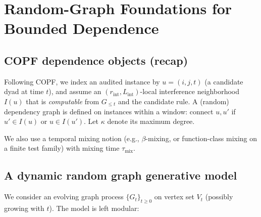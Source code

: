\documentclass[12pt,a4paper]{article}
\begin{document}


\section{Random-Graph Foundations for Bounded Dependence}
\label{sec:random_graph_foundations}

\subsection{COPF dependence objects (recap)}
Following COPF, we index an audited instance by
$u=(i,j,t)$ (a candidate dyad at time $t$), and assume
an $(r_{\mathrm{int}},L_{\mathrm{int}})$-local interference neighborhood $I(u)$
that is \emph{computable} from $G_{\le t}$ and the candidate rule.
A (random) dependency graph is defined on instances within a window:
connect $u,u'$ if $u'\in I(u)$ or $u\in I(u')$.
Let $\kappa$ denote its maximum degree.

We also use a temporal mixing notion (e.g., $\beta$-mixing, or function-class mixing on a
finite test family) with mixing time $\tau_{\mathrm{mix}}$.

\subsection{A dynamic random graph generative model}
\label{subsec:dyn_random_graph}

We consider an evolving graph process $\{G_t\}_{t\ge 0}$ on vertex set $V_t$
(possibly growing with $t$). The model is left modular:
\end{document}
